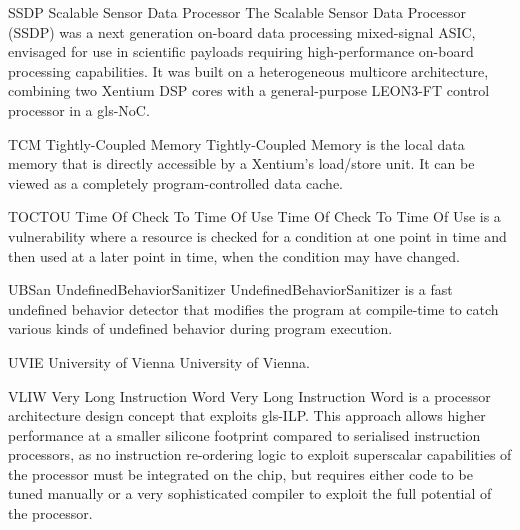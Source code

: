 

  {SSDP}            %
  {Scalable Sensor Data Processor}  %
  {The Scalable Sensor Data Processor (SSDP) was a next generation on-board %
   data processing mixed-signal ASIC, envisaged for use in scientific payloads %
   requiring high-performance on-board processing capabilities. It was built on %
   a heterogeneous multicore architecture, combining two %
   \gls{Xentium} \gls{DSP} cores with a general-purpose \gls{LEON3-FT} control %
   processor in a \gls{gls-NoC}.} %


%
  {TCM}%
  {Tightly-Coupled Memory}%
  {Tightly-Coupled Memory is the local data memory that is directly accessible %
   by a Xentium's load/store unit. It can be viewed as a completely %
   program-controlled data cache.}%

%
  {TOCTOU}%
  {Time Of Check To Time Of Use}%
  {Time Of Check To Time Of Use is a vulnerability where a resource is checked
   for a condition at one point in time and then used at a later point in time,
   when the condition may have changed.}%





%
  {UBSan}%
  {UndefinedBehaviorSanitizer}%
  {UndefinedBehaviorSanitizer is a fast undefined behavior detector that %
   modifies the program at compile-time to catch various kinds of undefined %
   behavior during program execution.}%

%
  {UVIE}%
  {University of Vienna}%
  {University of Vienna.}%

%
  {VLIW}%
  {Very Long Instruction Word}%
  {Very Long Instruction Word is a processor architecture design concept that
   exploits \gls{gls-ILP}. This approach allows higher performance at a smaller
   silicone footprint compared to serialised instruction processors, as no
   instruction re-ordering logic to exploit superscalar capabilities of the
   processor must be integrated on the chip, but requires either code to be
   tuned manually or a very sophisticated compiler to exploit the full potential
   of the processor.}%

